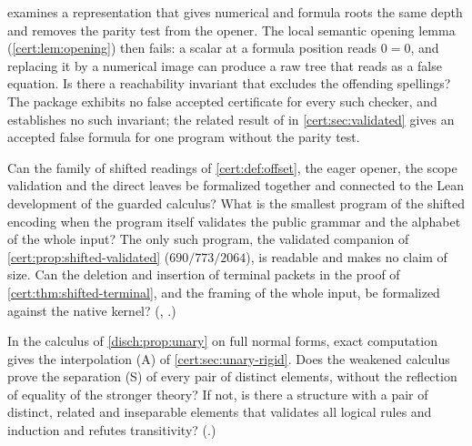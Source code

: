 \begin{question}
 examines a representation that gives numerical and formula
roots the same depth and removes the parity test from the opener. The local
semantic opening lemma (\cref{cert:lem:opening}) then fails: a scalar at a
formula position reads $0=0$, and replacing it by a numerical image can produce
a raw tree that reads as a false equation. Is there a reachability invariant
that excludes the offending spellings? The package exhibits no false accepted
certificate for every such checker, and establishes no such invariant; the
related result of  in \cref{cert:sec:validated} gives an
accepted false formula for one program without the parity test.
\end{question}

\begin{question}
Can the family of shifted readings of \cref{cert:def:offset}, the eager opener,
the scope validation and the direct leaves be formalized together and connected
to the Lean development of the guarded calculus? What is the smallest program of
the shifted encoding when the program itself validates the public grammar and
the alphabet of the whole input? The only such program, the validated companion
of \cref{cert:prop:shifted-validated} ($690/773/2064$), is readable and makes no
claim of size. Can the deletion and insertion of terminal packets in the proof of
\cref{cert:thm:shifted-terminal}, and the framing of the whole input, be
formalized against the native kernel? (, .)
\end{question}

\begin{question}
In the calculus of \cref{disch:prop:unary} on full normal forms, exact
computation gives the interpolation (A) of \cref{cert:sec:unary-rigid}. Does the
weakened calculus prove the separation (S) of every pair of distinct elements,
without the reflection of equality of the stronger theory? If not, is there a
structure with a pair of distinct, related and inseparable elements that
validates all logical rules and induction and refutes transitivity?
(.)
\end{question}

